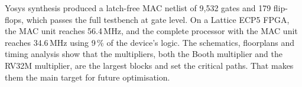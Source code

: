 Yosys synthesis produced a latch-free MAC netlist of 9{,}532 gates and 179
flip-flops, which passes the full testbench at gate level. On a Lattice ECP5
FPGA, the MAC unit reaches 56.4\,MHz, and the complete processor with the
MAC unit reaches 34.6\,MHz using 9\,\% of the device's logic. The schematics,
floorplans and timing analysis show that the multipliers, both the Booth
multiplier and the RV32M multiplier, are the largest blocks and set the
critical paths. That makes them the main target for future optimisation.
